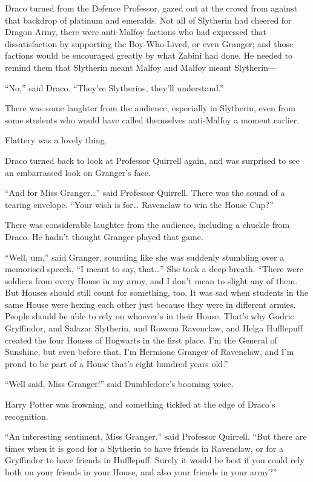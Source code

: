 Draco turned from the Defence Professor, gazed out at the crowd from
against that backdrop of platinum and emeralds. Not all of Slytherin had
cheered for Dragon Army, there were anti-Malfoy factions who had
expressed that dissatisfaction by supporting the Boy-Who-Lived, or even
Granger; and those factions would be encouraged greatly by what Zabini
had done. He needed to remind them that Slytherin meant Malfoy and
Malfoy meant Slytherin---

``No,'' said Draco. ``They're Slytherins, they'll understand.''

There was some laughter from the audience, especially in Slytherin, even
from some students who would have called themselves anti-Malfoy a moment
earlier.

Flattery was a lovely thing.

Draco turned back to look at Professor Quirrell again, and was surprised
to see an embarrassed look on Granger's face.

``And for Miss Granger\ldots{}'' said Professor Quirrell. There was the
sound of a tearing envelope. ``Your wish is for\ldots{} Ravenclaw to win
the House Cup?''

There was considerable laughter from the audience, including a chuckle
from Draco. He hadn't thought Granger played that game.

``Well, um,'' said Granger, sounding like she was suddenly stumbling
over a memorised speech, ``I meant to say, that\ldots{}'' She took a
deep breath. ``There were soldiers from every House in my army, and I
don't mean to slight any of them. But Houses should still count for
something, too. It was sad when students in the same House were hexing
each other just because they were in different armies. People should be
able to rely on whoever's in their House. That's why Godric Gryffindor,
and Salazar Slytherin, and Rowena Ravenclaw, and Helga Hufflepuff
created the four Houses of Hogwarts in the first place. I'm the General
of Sunshine, but even before that, I'm Hermione Granger of Ravenclaw,
and I'm proud to be part of a House that's eight hundred years old.''

``Well said, Miss Granger!'' said Dumbledore's booming voice.

Harry Potter was frowning, and something tickled at the edge of Draco's
recognition.

``An interesting sentiment, Miss Granger,'' said Professor Quirrell.
``But there are times when it is good for a Slytherin to have friends in
Ravenclaw, or for a Gryffindor to have friends in Hufflepuff. Surely it
would be best if you could rely both on your friends in your House, and
also your friends in your army?''


